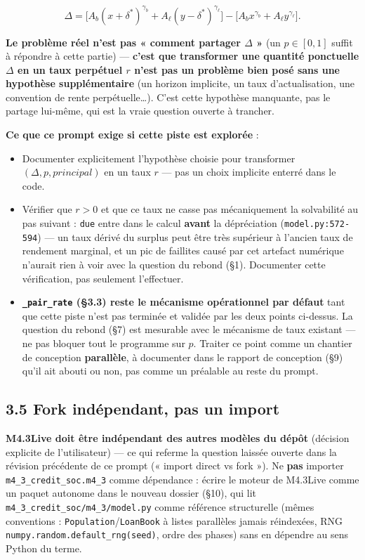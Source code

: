 \documentclass[11pt,a4paper]{article}
\newcommand{\code}[1]{\texttt{#1}}
\begin{document}
$$\Delta = \bigl[A_b(x+\delta^{*})^{\gamma_b} +
A_\ell(y-\delta^{*})^{\gamma_\ell}\bigr] - \bigl[A_b x^{\gamma_b} +
A_\ell y^{\gamma_\ell}\bigr].$$

\textbf{Le problème réel n'est pas « comment partager $\Delta$ »} (un
$p\in[0,1]$ suffit à répondre à cette partie) --- \textbf{c'est que
transformer une quantité ponctuelle $\Delta$ en un taux perpétuel $r$
n'est pas un problème bien posé sans une hypothèse supplémentaire} (un
horizon implicite, un taux d'actualisation, une convention de rente
perpétuelle\ldots). C'est cette hypothèse manquante, pas le partage
lui-même, qui est la vraie question ouverte à trancher.

\textbf{Ce que ce prompt exige si cette piste est explorée} :

\begin{itemize}
\item Documenter explicitement l'hypothèse choisie pour transformer
  $(\Delta, p, \mathit{principal})$ en un taux $r$ --- pas un choix
  implicite enterré dans le code.
\item Vérifier que $r>0$ et que ce taux ne casse pas mécaniquement la
  solvabilité au pas suivant : \code{due} entre dans le calcul
  \textbf{avant} la dépréciation (\code{model.py:572-594}) --- un taux
  dérivé du surplus peut être très supérieur à l'ancien taux de
  rendement marginal, et un pic de faillites causé par cet artefact
  numérique n'aurait rien à voir avec la question du rebond (\S1).
  Documenter cette vérification, pas seulement l'effectuer.
\item \textbf{\code{\_pair\_rate} (\S3.3) reste le mécanisme
  opérationnel par défaut} tant que cette piste n'est pas terminée et
  validée par les deux points ci-dessus. La question du rebond (\S7) est
  mesurable avec le mécanisme de taux existant --- ne pas bloquer tout le
  programme sur $p$. Traiter ce point comme un chantier de conception
  \textbf{parallèle}, à documenter dans le rapport de conception (\S9)
  qu'il ait abouti ou non, pas comme un préalable au reste du prompt.
\end{itemize}

\subsection*{3.5 Fork indépendant, pas un import}

\textbf{M4.3Live doit être indépendant des autres modèles du dépôt}
(décision explicite de l'utilisateur) --- ce qui referme la question
laissée ouverte dans la révision précédente de ce prompt (« import
direct vs fork »). Ne \textbf{pas} importer \code{m4\_3\_credit\_soc.m4\_3}
comme dépendance : écrire le moteur de M4.3Live comme un paquet autonome
dans le nouveau dossier (\S10), qui lit
\code{m4\_3\_credit\_soc/m4\_3/model.py} comme référence structurelle
(mêmes conventions : \code{Population}/\code{LoanBook} à listes
parallèles jamais réindexées, RNG \code{numpy.random.default\_rng(seed)},
ordre des phases) sans en dépendre au sens Python du terme.
\end{document}
